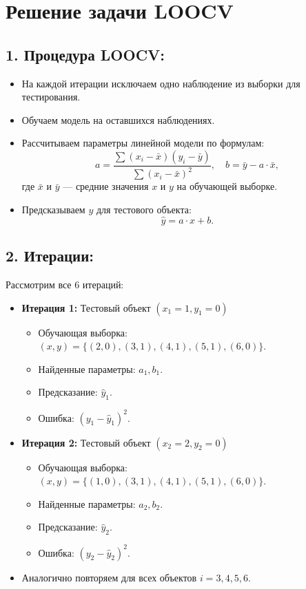 \section*{Решение задачи LOOCV}


\subsection*{1. Процедура LOOCV:}
\begin{itemize}
    \item На каждой итерации исключаем одно наблюдение из выборки для тестирования.
    \item Обучаем модель на оставшихся наблюдениях.
    \item Рассчитываем параметры линейной модели по формулам:
    \[
    a = \frac{\sum (x_i - \bar{x})(y_i - \bar{y})}{\sum (x_i - \bar{x})^2}, \quad b = \bar{y} - a \cdot \bar{x},
    \]
    где \(\bar{x}\) и \(\bar{y}\) — средние значения \(x\) и \(y\) на обучающей выборке.
    \item Предсказываем \(y\) для тестового объекта:
    \[
    \hat{y} = a \cdot x + b.
    \]
\end{itemize}

\subsection*{2. Итерации:}
Рассмотрим все 6 итераций:
\begin{itemize}
    \item \textbf{Итерация 1:} Тестовый объект \( (x_1 = 1, y_1 = 0) \)
    \begin{itemize}
        \item Обучающая выборка: \( (x, y) = \{(2, 0), (3, 1), (4, 1), (5, 1), (6, 0)\} \).
        \item Найденные параметры: \( a_1, b_1 \).
        \item Предсказание: \( \hat{y}_1 \).
        \item Ошибка: \( (y_1 - \hat{y}_1)^2 \).
    \end{itemize}
    \item \textbf{Итерация 2:} Тестовый объект \( (x_2 = 2, y_2 = 0) \)
    \begin{itemize}
        \item Обучающая выборка: \( (x, y) = \{(1, 0), (3, 1), (4, 1), (5, 1), (6, 0)\} \).
        \item Найденные параметры: \( a_2, b_2 \).
        \item Предсказание: \( \hat{y}_2 \).
        \item Ошибка: \( (y_2 - \hat{y}_2)^2 \).
    \end{itemize}
    \item Аналогично повторяем для всех объектов \( i = 3, 4, 5, 6 \).
\end{itemize}

